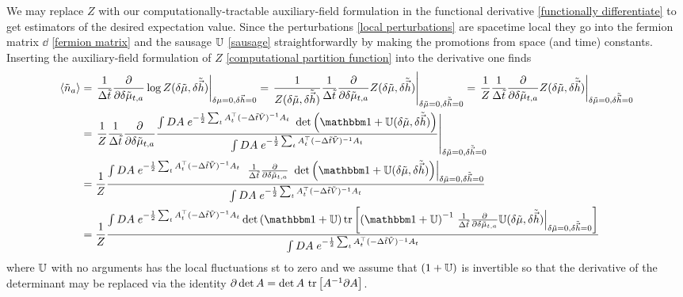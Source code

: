 We may replace $Z$ with our computationally-tractable auxiliary-field formulation in the functional derivative \eqref{functionally differentiate} to get estimators of the desired expectation value.
Since the perturbations \eqref{local perturbations} are spacetime local they go into the fermion matrix $\dd$ \eqref{fermion matrix} and the sausage $\mathbb{U}$ \eqref{sausage} straightforwardly by making the promotions from space (and time) constants.
Inserting the auxiliary-field formulation of $Z$ \eqref{computational partition function} into the derivative one finds
\begin{align}
	\expectation{\tilde{n}_a} &= \left.\oneover{\Delta\tilde{t}} \frac{\partial}{\partial \delta\tilde{\mu}_{t,a}} \log Z(\delta\tilde{\mu}, \delta\tilde{\vec{h}})\right|_{\delta\mu=0, \delta\vec{h}=0}
	=
	\left.\oneover{Z(\delta\tilde{\mu}, \delta\tilde{\vec{h}})} \oneover{\Delta\tilde{t}} \frac{\partial}{\partial \delta\tilde{\mu}_{t,a}} Z(\delta\tilde{\mu}, \delta\tilde{\vec{h}})\right|_{\delta\tilde{\mu}=0, \delta\tilde{\vec{h}}=0}
	=
	\left.\oneover{Z} \oneover{\Delta\tilde{t}} \frac{\partial}{\partial \delta\tilde{\mu}_{t,a}} Z(\delta\tilde{\mu}, \delta\tilde{\vec{h}})\right|_{\delta\tilde{\mu}=0, \delta\tilde{\vec{h}}=0}
	\nonumber\\
	&=
	\left.\oneover{Z} \oneover{\Delta\tilde{t}} \frac{\partial}{\partial \delta\tilde{\mu}_{t,a}} \frac{  
		\int DA\; e^{-\frac{1}{2} \sum_t A\transpose_t (-\Delta\tilde{t} \tilde{V})\inverse A_t}
	~	\det \left(\one + \UU(\delta\tilde{\mu}, \delta\tilde{\vec{h}}) \right)
	}{ 
		\int DA\; e^{-\frac{1}{2} \sum_t A\transpose_t (-\Delta\tilde{t} \tilde{V})\inverse A_t}
	}\right|_{\delta\tilde{\mu}=0, \delta\tilde{\vec{h}}=0}
	\nonumber\\
	&=
	\oneover{Z} \frac{  
		\int DA\; e^{-\frac{1}{2} \sum_t A\transpose_t (-\Delta\tilde{t} \tilde{V})\inverse A_t}
	~	\left.\oneover{\Delta\tilde{t}} \frac{\partial}{\partial \delta\tilde{\mu}_{t,a}}
	~	\det \left(\one + \UU(\delta\tilde{\mu}, \delta\tilde{\vec{h}}) \right)\right|_{\delta\tilde{\mu}=0, \delta\tilde{\vec{h}}=0}
	}{ 
		\int DA\; e^{-\frac{1}{2} \sum_t A\transpose_t (-\Delta\tilde{t} \tilde{V})\inverse A_t}
	}
	\nonumber\\
	&=
	\oneover{Z}  \frac{  
		\int DA\; e^{-\frac{1}{2} \sum_t A\transpose_t (-\Delta\tilde{t} \tilde{V})\inverse A_t}
		\det \left(\one + \UU \right) \tr{\left(\one + \UU \right)\inverse \left.\oneover{\Delta\tilde{t}} \frac{\partial}{\partial \delta\tilde{\mu}_{t,a}} \UU(\delta\tilde{\mu}, \delta\tilde{\vec{h}})\right|_{\delta\tilde{\mu}=0, \delta\tilde{\vec{h}}=0}}
	}{ 
		\int DA\; e^{-\frac{1}{2} \sum_t A\transpose_t (-\Delta\tilde{t} \tilde{V})\inverse A_t}
	}
\end{align}
where $\mathbb{U}$ with no arguments has the local fluctuations st to zero and we assume that $(1+\mathbb{U})$ is invertible so that the derivative of the determinant may be replaced via the identity $\partial \det{A} = \det A ~ \text{tr}\left[ A^{-1} \partial A\right]$.

